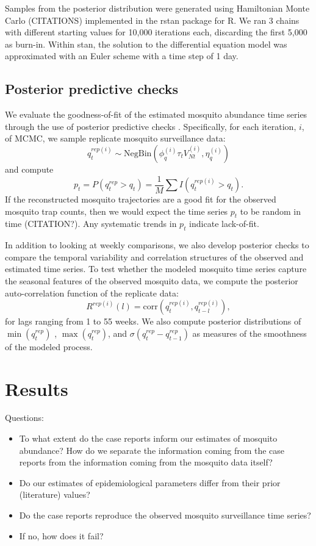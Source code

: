 \documentclass[10pt,letterpaper]{article}
\begin{document}
Samples from the posterior distribution were generated using Hamiltonian Monte Carlo (CITATIONS) implemented in the rstan package for R. 
We ran 3 chains with different starting values for 10,000 iterations each, discarding the first 5,000 as burn-in.
Within stan, the solution to the differential equation model was approximated with an Euler scheme with a time step of 1 day.  

\subsection*{Posterior predictive checks}

We evaluate the goodness-of-fit of the estimated mosquito abundance time series through the use of posterior predictive checks \cite{Gelman1996,Gelman2003}.
Specifically, for each iteration, $i$, of MCMC, we sample replicate mosquito surveillance data:
\begin{equation}
q^{rep(i)}_t \sim \text{NegBin}(\phi^{(i)}_q \tau_t V^{(i)}_{Nt}, \eta^{(i)}_q)
\end{equation}
and compute
\begin{equation}
p_t = P(q^{rep}_t > q_t) = \frac{1}{M}\sum I(q^{rep(i)}_t > q_t).
\end{equation}
If the reconstructed mosquito trajectories are a good fit for the observed mosquito trap counts, then we would expect the time series $p_t$ to be random in time (CITATION?).
Any systematic trends in $p_t$ indicate lack-of-fit.

In addition to looking at weekly comparisons, we also develop posterior checks to compare the temporal variability and correlation structures of the observed and estimated time series.
To test whether the modeled mosquito time series capture the seasonal features of the observed mosquito data, we compute the posterior auto-correlation function of the replicate data:
\begin{equation}
R^{rep(i)}(l) = \text{corr}(q^{rep(i)}_t, q^{rep(i)}_{t-l}),
\end{equation}
for lags ranging from 1 to 55 weeks.
We also compute posterior distributions of $\min(q^{rep}_t)$ , $\max(q^{rep}_t)$, and $\sigma(q^{rep}_t - q^{rep}_{t-1})$ as measures of the smoothness of the modeled process.

\section*{Results}

Questions:
\begin{itemize}
	\item To what extent do the case reports inform our estimates of mosquito abundance? How do we separate the information coming from the case reports from the information coming from the mosquito data itself?
	\item Do our estimates of epidemiological parameters differ from their prior (literature) values?
	\item Do the case reports reproduce the observed mosquito surveillance time series?
	\item If no, how does it fail?
\end{itemize}
\end{document}
